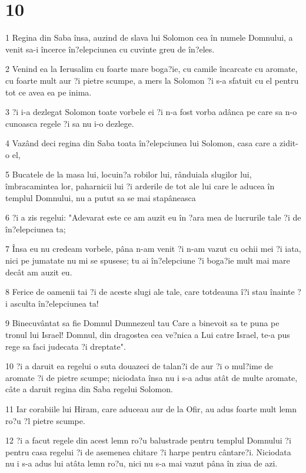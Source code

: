\chapter{10}

\par 1 Regina din Saba însa, auzind de slava lui Solomon cea în numele Domnului, a venit sa-i încerce în?elepciunea cu cuvinte greu de în?eles.
\par 2 Venind ea la Ierusalim cu foarte mare boga?ie, cu camile încarcate cu aromate, cu foarte mult aur ?i pietre scumpe, a mers la Solomon ?i s-a sfatuit cu el pentru tot ce avea ea pe inima.
\par 3 ?i i-a dezlegat Solomon toate vorbele ei ?i n-a fost vorba adânca pe care sa n-o cunoasca regele ?i sa nu i-o dezlege.
\par 4 Vazând deci regina din Saba toata în?elepciunea lui Solomon, casa care a zidit-o el,
\par 5 Bucatele de la masa lui, locuin?a robilor lui, rânduiala slugilor lui, îmbracamintea lor, paharnicii lui ?i arderile de tot ale lui care le aducea în templul Domnului, nu a putut sa se mai stapâneasca
\par 6 ?i a zis regelui: "Adevarat este ce am auzit eu în ?ara mea de lucrurile tale ?i de în?elepciunea ta;
\par 7 Însa eu nu credeam vorbele, pâna n-am venit ?i n-am vazut cu ochii mei ?i iata, nici pe jumatate nu mi se spusese; tu ai în?elepciune ?i boga?ie mult mai mare decât am auzit eu.
\par 8 Ferice de oamenii tai ?i de aceste slugi ale tale, care totdeauna î?i stau înainte ?i asculta în?elepciunea ta!
\par 9 Binecuvântat sa fie Domnul Dumnezeul tau Care a binevoit sa te puna pe tronul lui Israel! Domnul, din dragostea cea ve?nica a Lui catre Israel, te-a pus rege sa faci judecata ?i dreptate".
\par 10 ?i a daruit ea regelui o suta douazeci de talan?i de aur ?i o mul?ime de aromate ?i de pietre scumpe; niciodata însa nu i s-a adus atât de multe aromate, câte a daruit regina din Saba regelui Solomon.
\par 11 Iar corabiile lui Hiram, care aduceau aur de la Ofir, au adus foarte mult lemn ro?u ?l pietre scumpe.
\par 12 ?i a facut regele din acest lemn ro?u balustrade pentru templul Domnului ?i pentru casa regelui ?i de asemenea chitare ?i harpe pentru cântare?i. Niciodata nu i s-a adus lui atâta lemn ro?u, nici nu s-a mai vazut pâna în ziua de azi.
